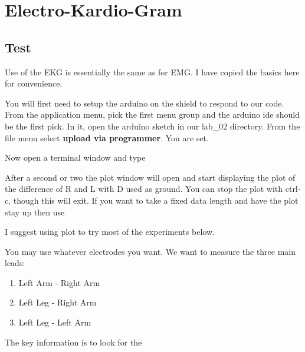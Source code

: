 \chapter{Electro-Kardio-Gram}

\section{Test}

Use of the EKG is essentially the same as for EMG.  I have copied the basics here for convenience.  

You will first need to setup the arduino on the shield to respond to our code.  From the application menu, pick the first menu group and the arduino ide should be the first pick.  In it, open the arduino sketch in our lab\_02 directory.  From the file menu select \textbf{upload via programmer}.  You are set.

Now open a terminal window and type



After a second or two the plot window will open and start displaying the plot of the difference of R and L with D used as ground.  You can stop the plot with ctrl-c, though this will exit.  If you want to take a fixed data length and have the plot stay up then use


I suggest using plot to try most of the experiments below.

You may use whatever electrodes you want.  We want to measure the three main leads:
\begin{enumerate}
\item Left Arm - Right Arm
\item Left Leg - Right Arm
\item Left Leg - Left Arm
\end{enumerate}
The key information is to look for the 
